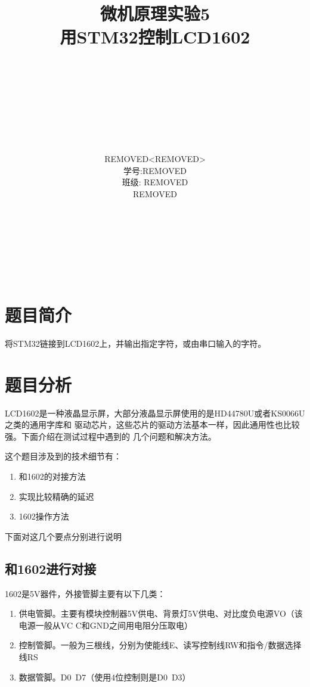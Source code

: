 \documentclass[a4paper]{ctexart}
\author{\\\\\\\\\\\\\\\\REMOVED<REMOVED>\\学号:REMOVED\\班级: REMOVED\\REMOVED\\\\\\\\\\\\\\}
\title{微机原理实验5\\用STM32控制LCD1602}
\begin{document}
\begin{titlepage}
\maketitle
\thispagestyle{empty}
\newpage
\tableofcontents
\thispagestyle{empty}
\end{titlepage}

\setcounter{page}{1}
\lstset{language=C, 
    numbers=left, 
    frame=single,
    breaklines=true,
    breakautoindent=false,
    numberstyle=\tiny,
    fontadjust,
    basicstyle=\ttfamily
    }

\section{题目简介} 

将STM32链接到LCD1602上，并输出指定字符，或由串口输入的字符。

\section{题目分析}

LCD1602是一种液晶显示屏，大部分液晶显示屏使用的是HD44780U或者KS0066U之类的通用字库和
驱动芯片，这些芯片的驱动方法基本一样，因此通用性也比较强。下面介绍在测试过程中遇到的
几个问题和解决方法。

这个题目涉及到的技术细节有：
\begin{enumerate}[1.]
\item 和1602的对接方法
\item 实现比较精确的延迟
\item 1602操作方法
\end{enumerate}
下面对这几个要点分别进行说明

\subsection{和1602进行对接}

1602是5V器件，外接管脚主要有以下几类：
\begin{enumerate}
\item 供电管脚。主要有模块控制器5V供电、背景灯5V供电、对比度负电源VO（该电源一般从VC
C和GND之间用电阻分压取电）
\item 控制管脚。一般为三根线，分别为使能线E、读写控制线RW和指令/数据选择线RS
\item 数据管脚。D0~D7（使用4位控制则是D0~D3）
\end{enumerate}
\end{document}
